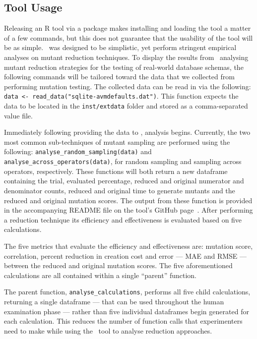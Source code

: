 \subsection{Tool Usage}

Releasing an R tool via a package makes installing and loading the tool
a matter of a few commands, but this does not guarantee that the usability
of the tool will be as simple. \mr~was designed to be simplistic,
yet perform stringent empirical analyses on mutant reduction techniques.
To display the results from \mr~analysing mutant reduction strategies for the
testing of real-world database schemas, the following commands will be tailored
toward the data that we collected from performing mutation testing.
The collected data can be read in via the following: {\small\texttt{data <- read\_data("sqlite-avmdefaults.dat")}}.
This function expects the data to be located in the \texttt{inst/extdata} folder
and stored as a comma-separated value file.

Immediately following providing the data to \mr, analysis begins. Currently,
the two most common sub-techniques of mutant sampling are performed using the following:
\texttt{analyse\_random\_sampling(data)} and \texttt{analyse\_across\_operators(data)},
for random sampling and sampling across operators, respectively.
These functions will both return a new dataframe containing the trial, evaluated
percentage, reduced and original numerator and denominator counts,
reduced and original time to generate mutants and the reduced and original mutation scores.
The output from these function is provided in the accompanying README file on the
tool's GitHub page~\cite{tool}. After performing a reduction technique its efficiency
and effectiveness is evaluated based on five calculations.

The five metrics that evaluate the efficiency and effectiveness are:
mutation score, correlation, percent reduction in creation cost and error
--- MAE and RMSE --- between the reduced and original mutation scores.
The five aforementioned calculations are all contained within a single ``parent'' function.

The parent function, \texttt{analyse\_calculations}, performs all five child
calculations, returning a single dataframe --- that can be used throughout the human
examination phase --- rather than five individual dataframes begin generated for
each calculation. This reduces the number of function calls that experimenters
need to make while using the \mr~tool to analyse reduction approaches.

